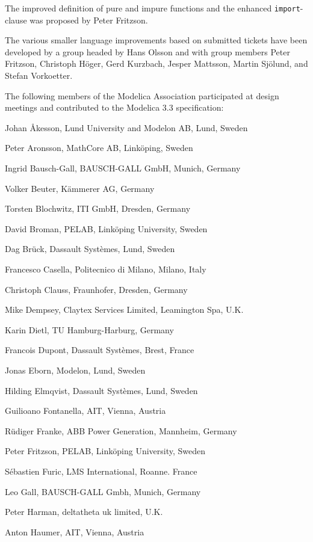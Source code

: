 The improved definition of pure and impure functions and the enhanced \lstinline!import!-clause was proposed by Peter Fritzson.

The various smaller language improvements based on submitted tickets
have been developed by a group headed by Hans Olsson and with group
members Peter Fritzson, Christoph Höger, Gerd Kurzbach, Jesper Mattsson,
Martin Sjölund, and Stefan Vorkoetter.

The following members of the Modelica Association participated at design
meetings and contributed to the Modelica 3.3 specification:
\begin{contributors}
\item Johan Åkesson, Lund University and Modelon AB, Lund, Sweden
\item Peter Aronsson, MathCore AB, Linköping, Sweden
\item Ingrid Bausch-Gall, BAUSCH-GALL GmbH, Munich, Germany
\item Volker Beuter, Kämmerer AG, Germany
\item Torsten Blochwitz, ITI GmbH, Dresden, Germany
\item David Broman, PELAB, Linköping University, Sweden
\item Dag Brück, Dassault Systèmes, Lund, Sweden
\item Francesco Casella, Politecnico di Milano, Milano, Italy
\item Christoph Clauss, Fraunhofer, Dresden, Germany
\item Mike Dempsey, Claytex Services Limited, Leamington Spa, U.K.
\item Karin Dietl, TU Hamburg-Harburg, Germany
\item Francois Dupont, Dassault Systèmes, Brest, France
\item Jonas Eborn, Modelon, Lund, Sweden
\item Hilding Elmqvist, Dassault Systèmes, Lund, Sweden
\item Guilioano Fontanella, AIT, Vienna, Austria
\item Rüdiger Franke, ABB Power Generation, Mannheim, Germany
\item Peter Fritzson, PELAB, Linköping University, Sweden
\item Sébastien Furic, LMS International, Roanne. France
\item Leo Gall, BAUSCH-GALL Gmbh, Munich, Germany
\item Peter Harman, deltatheta uk limited, U.K.
\item Anton Haumer, AIT, Vienna, Austria

\end{contributors}
